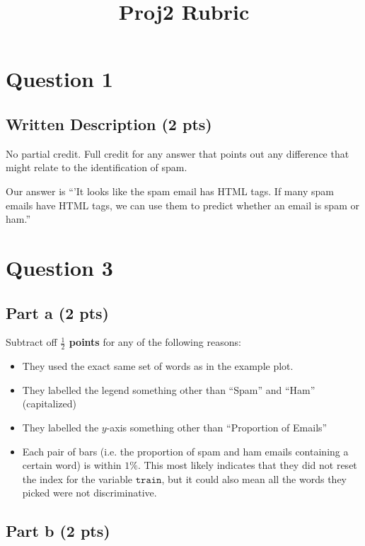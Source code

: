 \documentclass{article}
\begin{document}
\title{Proj2 Rubric}       


\maketitle

\section*{Question 1}
 
\subsection*{Written Description (2 pts)}

No partial credit. Full credit for any answer that points out any difference that might relate to the identification of spam.

\noindent Our answer is ``'It looks like the spam email has HTML tags. If many spam emails have HTML tags, we can use them to predict whether an email is spam or ham.'' 


\section*{Question 3}

\subsection*{Part a (2 pts)}

Subtract off {\bf $\frac{1}{2}$ points} for any of the following reasons:
\begin{itemize}
\item They used the exact same set of words as in the example plot.
\item They labelled the legend something other than ``Spam'' and ``Ham'' (capitalized)
\item They labelled the $y$-axis something other than ``Proportion of Emails''
\item Each pair of bars (i.e. the proportion of spam and ham emails containing a certain word) is within $1\%$. This most likely indicates that they did not reset the index for the variable $\texttt{train}$, but it could also mean all the words they picked were not discriminative.
\end{itemize}

\subsection*{Part b (2 pts)}
\end{document}
